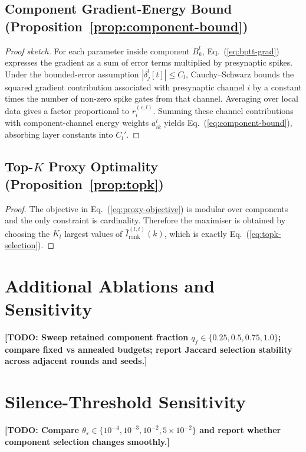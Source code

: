 \documentclass{article} %
\newcommand{\todo}[1]{{\color{red}\textbf{[TODO: #1]}}}
\begin{document}
\subsection{Component Gradient-Energy Bound (Proposition~\ref{prop:component-bound})}
\label{app:proof-component-bound}
\begin{proof}[Proof sketch]
For each parameter inside component $B_k^l$, Eq.~(\ref{eq:bptt-grad}) expresses the gradient as a sum of error terms multiplied by presynaptic spikes. Under the bounded-error assumption $|\delta_j^l[t]|\le C_l$, Cauchy--Schwarz bounds the squared gradient contribution associated with presynaptic channel $i$ by a constant times the number of non-zero spike gates from that channel. Averaging over local data gives a factor proportional to $r_i^{(c,l)}$. Summing these channel contributions with component-channel energy weights $a_{ik}^l$ yields Eq.~(\ref{eq:component-bound}), absorbing layer constants into $C_l'$.
\end{proof}

\subsection{Top-$K$ Proxy Optimality (Proposition~\ref{prop:topk})}
\label{app:proof-topk}
\begin{proof}
The objective in Eq.~(\ref{eq:proxy-objective}) is modular over components and the only constraint is cardinality. Therefore the maximiser is obtained by choosing the $K_l$ largest values of $\bar I_{\text{rank}}^{(l,t)}(k)$, which is exactly Eq.~(\ref{eq:topk-selection}).
\end{proof}

\section{Additional Ablations and Sensitivity}
\label{app:additional}
\todo{Sweep retained component fraction $q_f\in\{0.25,0.5,0.75,1.0\}$; compare fixed vs annealed budgets; report Jaccard selection stability across adjacent rounds and seeds.}

\section{Silence-Threshold Sensitivity}
\label{app:threshold}
\todo{Compare $\theta_s\in\{10^{-4},10^{-3},10^{-2},5\!\times\!10^{-2}\}$ and report whether component selection changes smoothly.}
\end{document}
